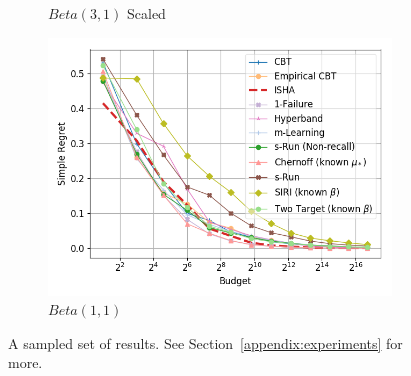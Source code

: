 \begin{figure}
\begin{subfigure}{0.325\textwidth}
	\caption{$Beta(3,1)$ Scaled}
	\label{fig:sh-anytime:alpha1_beta3_scaled}
\end{subfigure}
\begin{subfigure}{0.325\textwidth}%
	\includegraphics[width=\textwidth]{fixedbudget/figures/folder2/alpha1_beta1_unscaled.png}
	\caption{$Beta(1,1)$ }
	\label{fig:sh-unscaled-alpha1_beta1_unscaled}
\end{subfigure}
\caption{A sampled set of results. See Section~\ref{appendix:experiments} for more.}
\end{figure}


